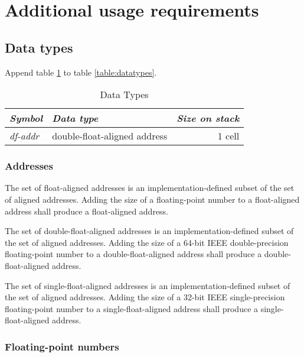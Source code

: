 
\section{Additional usage requirements} %

\subsection{Data types} %
\label{float:datatypes}

Append table \ref{float:types} to table \ref{table:datatypes}.

\begin{table}[ht]
  \begin{center}
	\caption{Data Types}
	\label{float:types}
	\begin{tabular}{llr}
	\hline\hline
	\emph{Symbol} & \emph{Data type} & \emph{Size on stack} \\
	\hline
	\emph{df-addr}	& double-float-aligned address	& 1 cell \\
	\hline\hline
	\end{tabular}
  \end{center}
\end{table}

\subsubsection{Addresses} %
\label{float:addr}

The set of float-aligned addresses is an implementation-defined
subset of the set of aligned addresses. Adding the size of a
floating-point number to a float-aligned address shall produce
a float-aligned address.

The set of double-float-aligned addresses is an implementation-defined
subset of the set of aligned addresses. Adding the size of a 64-bit
IEEE double-precision floating-point number to a double-float-aligned
address shall produce a double-float-aligned address.

The set of single-float-aligned addresses is an implementation-defined
subset of the set of aligned addresses. Adding the size of a 32-bit
IEEE single-precision floating-point number to a single-float-aligned
address shall produce a single-float-aligned address.

\subsubsection{Floating-point numbers} %
\label{float:num}

